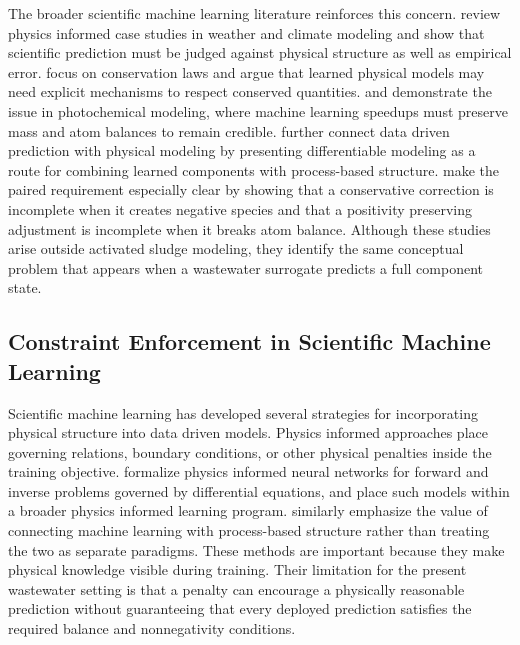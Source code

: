 \documentclass[12pt, twoside]{book}
\begin{document}
The broader scientific machine learning literature reinforces this concern. \citet{Kashinath2021} review
physics informed case studies in weather and climate modeling and show that scientific prediction must be
judged against physical structure as well as empirical error. \citet{Hansen2024} focus on conservation laws
and argue that learned physical models may need explicit mechanisms to respect conserved quantities.
\citet{SturmWexler2020} and \citet{SturmWexler2022} demonstrate the issue in photochemical modeling, where
machine learning speedups must preserve mass and atom balances to remain credible. \citet{Shen2023} further
connect data driven prediction with physical modeling by presenting differentiable modeling as a route for
combining learned components with process-based structure. \citet{KircherVotsmeier2025}
make the paired requirement especially clear by showing that a conservative correction is incomplete when it
creates negative species and that a positivity preserving adjustment is incomplete when it breaks atom balance.
Although these studies arise outside activated sludge modeling, they identify the same conceptual problem that
appears when a wastewater surrogate predicts a full component state.

\subsection{Constraint Enforcement in Scientific Machine Learning}

Scientific machine learning has developed several strategies for incorporating physical structure into
data driven models. Physics informed approaches place governing relations, boundary conditions, or other
physical penalties inside the training objective. \citet{Raissi2019} formalize physics informed neural
networks for forward and inverse problems governed by differential equations, and \citet{Karniadakis2021}
place such models within a broader physics informed learning program. \citet{Shen2023} similarly emphasize
the value of connecting machine learning with process-based structure rather than treating the two as
separate paradigms. These methods are important because they make physical knowledge visible during training.
Their limitation for the present wastewater setting is that a penalty can encourage a physically reasonable
prediction without guaranteeing that every deployed prediction satisfies the required balance and
nonnegativity conditions.
\end{document}
